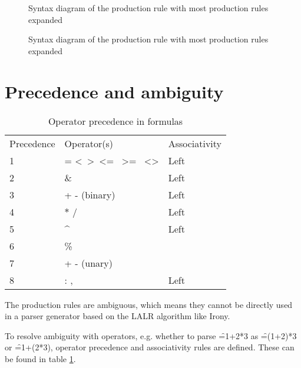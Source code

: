 
\begin{figure}
	\caption{Syntax diagram of the  production rule with most production rules expanded}
	\label{figure:Formula}
	
\end{figure}

\begin{figure}
	\caption{Syntax diagram of the  production rule with most production rules expanded}
	\label{figure:Reference}
	
\end{figure}

\section{Precedence and ambiguity}

\begin{table}
\small
\caption{Operator precedence in formulas}
\label{table:operatorprec}
\begin{tabular}{lll}
Precedence & Operator(s) & Associativity \\
1 & = \textless \  \textgreater \  \textless= \  \textgreater= \  \textless\textgreater & Left         \\
2 & \& & Left \\
3 & + - (binary) & Left \\
4 & $\ast$ / & Left \\
5 & \textasciicircum & Left\footnotemark \\
6 & \% & \\
7 & + - (unary) & \\
8 & : , \texttt{\char32} & Left
\end{tabular}
\end{table}


The production rules are ambiguous, which means they cannot be directly used in a parser generator based on the LALR algorithm like Irony.

To resolve ambiguity with operators, e.g. whether to parse \f{=1+2*3} as \f{=(1+2)*3} or \f{=1+(2*3)}, operator precedence and associativity rules are defined.
These can be found in table \ref{table:operatorprec}.

